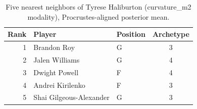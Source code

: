 \begin{table}[htbp]
  \centering\small
  \begin{tabular}{rllc}
    \toprule
    Rank & Player & Position & Archetype \\
    \midrule
    1 & Brandon Roy & G & 3 \\
    2 & Jalen Williams & G & 4 \\
    3 & Dwight Powell & F & 4 \\
    4 & Andrei Kirilenko & F & 3 \\
    5 & Shai Gilgeous-Alexander & G & 3 \\
    \bottomrule
  \end{tabular}
  \caption{Five nearest neighbors of Tyrese Haliburton (curvature_m2 modality), Procrustes-aligned posterior mean.}
  \label{tab:Tyrese_Haliburton_neighbors_curvature_m2}
\end{table}

